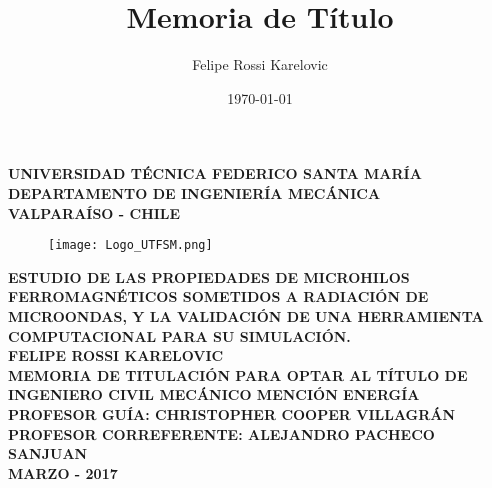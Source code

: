 \documentclass[12pt,letterpaper]{article}
\title{Memoria de Título}
\author{Felipe Rossi Karelovic}
\date{\today}
\numberwithin{equation}{section}
\begin{document}
\begin{titlepage}
	
	\begin{center}
		\vspace*{-1in}
		
		\Large \textbf{UNIVERSIDAD TÉCNICA FEDERICO SANTA MARÍA}\\
		\vspace*{0.15in}
		\large \textbf{DEPARTAMENTO DE INGENIERÍA MECÁNICA} \\
		\vspace*{0.15in}
		\textbf{VALPARAÍSO - CHILE}
		
		\begin{figure}[h!]
			\centering\texttt{[image: Logo\_UTFSM.png]}
		\end{figure}
		\vspace*{0.15in}
		\Large \textbf{ESTUDIO DE LAS PROPIEDADES DE MICROHILOS FERROMAGNÉTICOS SOMETIDOS A RADIACIÓN DE MICROONDAS, Y LA VALIDACIÓN DE UNA HERRAMIENTA COMPUTACIONAL PARA SU SIMULACIÓN.}\\
		\vspace*{1in}
		\large\centering \textbf{FELIPE ROSSI KARELOVIC}\\
		\vspace*{0.15in}
		\centering\normalsize \textbf{MEMORIA DE TITULACIÓN PARA OPTAR AL TÍTULO DE INGENIERO CIVIL MECÁNICO MENCIÓN ENERGÍA}\\
		\vspace*{0.6in}
		\centering\normalsize \textbf{PROFESOR GUÍA: \hspace{2.5cm} CHRISTOPHER COOPER VILLAGRÁN}\\
		\vspace*{0.15in}
		\centering\normalsize \textbf{PROFESOR CORREFERENTE: \hspace{1cm} ALEJANDRO PACHECO SANJUAN}\\
		\vspace*{1in}
		\centering\normalsize \textbf{MARZO - 2017}\\



	\end{center}
	
\end{titlepage}
\newpage\null\thispagestyle{empty}\newpage
\end{document}
